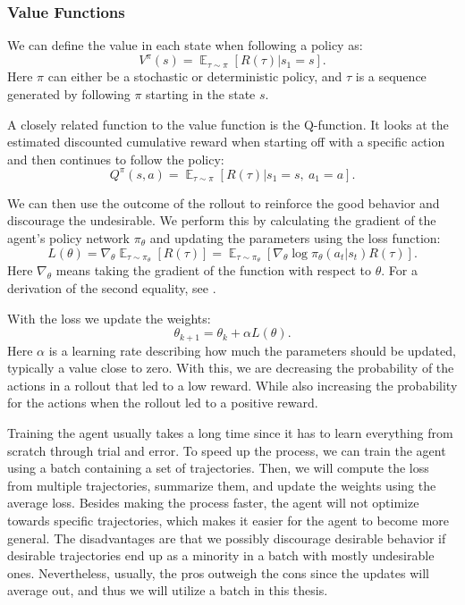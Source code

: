 \documentclass[12pt,A4]{report}
\theoremstyle{definition}
\begin{document}
\subsubsection{Value Functions}

We can define the value in each state when following a policy as:
\[ V^\pi(s) = \mathop{\mathbb{E}}_{\tau \sim \pi} [R(\tau) | s_1 = s].\]
Here $\pi$ can either be a stochastic or deterministic policy, and $\tau$ is a sequence generated by following $\pi$ starting in the state $s$.

A closely related function to the value function is the Q-function. It looks at the estimated discounted cumulative reward when starting off with a specific action and then continues to follow the policy:
\[ Q^\pi(s, a) = \mathop{\mathbb{E}}_{\tau \sim \pi} [R(\tau) | s_1 = s, \ a_1 = a].\]

We can then use the outcome of the rollout to reinforce the good behavior and discourage the undesirable. We perform this by calculating the gradient of the agent's policy network $\pi_\theta$ and updating the parameters using the loss function:
\[ L(\theta) = \nabla_\theta \mathop{\mathbb{E}}_{\tau \sim \pi_\theta}[R(\tau)] = \mathop{\mathbb{E}}_{\tau \sim \pi_\theta} [\nabla_\theta \log \pi_\theta (a_t|s_t) R(\tau) ]. \]
Here $\nabla_\theta$ means taking the gradient of the function with respect to $\theta$. For a derivation of the second equality, see \citet{OpenAI}. 

With the loss we update the weights:
\[ \theta_{k+1} = \theta_k + \alpha L(\theta).\]
Here $\alpha$ is a learning rate describing how much the parameters should be updated, typically a value close to zero. With this, we are decreasing the probability of the actions in a rollout that led to a low reward. While also increasing the probability for the actions when the rollout led to a positive reward.


Training the agent usually takes a long time since it has to learn everything from scratch through trial and error. To speed up the process, we can train the agent using a batch containing a set of trajectories. Then, we will compute the loss from multiple trajectories, summarize them, and update the weights using the average loss. Besides making the process faster, the agent will not optimize towards specific trajectories, which makes it easier for the agent to become more general. The disadvantages are that we possibly discourage desirable behavior if desirable trajectories end up as a minority in a batch with mostly undesirable ones. Nevertheless, usually, the pros outweigh the cons since the updates will average out, and thus we will utilize a batch in this thesis.
\end{document}
